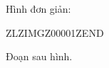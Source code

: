 \documentclass[12pt]{article}
\begin{document}
Hình đơn giản:



ZLZIMGZ00001ZEND



Đoạn sau hình.
\end{document}
